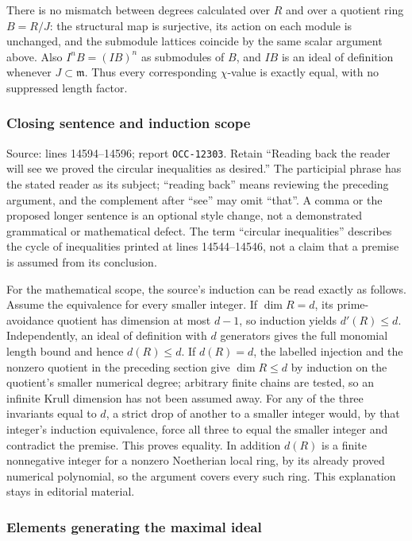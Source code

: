 There is no mismatch between degrees calculated over \(R\) and over a quotient ring \(B=R/J\): the structural map is surjective, its action on each module is unchanged, and the submodule lattices coincide by the same scalar argument above. Also \(I^nB=(IB)^n\) as submodules of \(B\), and \(IB\) is an ideal of definition whenever \(J\subset\mathfrak m\). Thus every corresponding \(\chi\)-value is exactly equal, with no suppressed length factor.

\subsubsection{Closing sentence and induction scope}\label{closing-sentence-and-induction-scope}

Source: lines 14594--14596; report \texttt{OCC-12303}. Retain ``Reading back the reader will see we proved the circular inequalities as desired.'' The participial phrase has the stated reader as its subject; ``reading back'' means reviewing the preceding argument, and the complement after ``see'' may omit ``that''. A comma or the proposed longer sentence is an optional style change, not a demonstrated grammatical or mathematical defect. The term ``circular inequalities'' describes the cycle of inequalities printed at lines 14544--14546, not a claim that a premise is assumed from its conclusion.

For the mathematical scope, the source's induction can be read exactly as follows. Assume the equivalence for every smaller integer. If \(\dim R=d\), its prime-avoidance quotient has dimension at most \(d-1\), so induction yields \(d'(R)\leq d\). Independently, an ideal of definition with \(d\) generators gives the full monomial length bound and hence \(d(R)\leq d\). If \(d(R)=d\), the labelled injection and the nonzero quotient in the preceding section give \(\dim R\leq d\) by induction on the quotient's smaller numerical degree; arbitrary finite chains are tested, so an infinite Krull dimension has not been assumed away. For any of the three invariants equal to \(d\), a strict drop of another to a smaller integer would, by that integer's induction equivalence, force all three to equal the smaller integer and contradict the premise. This proves equality. In addition \(d(R)\) is a finite nonnegative integer for a nonzero Noetherian local ring, by its already proved numerical polynomial, so the argument covers every such ring. This explanation stays in editorial material.

\subsubsection{Elements generating the maximal ideal}\label{elements-generating-the-maximal-ideal}

